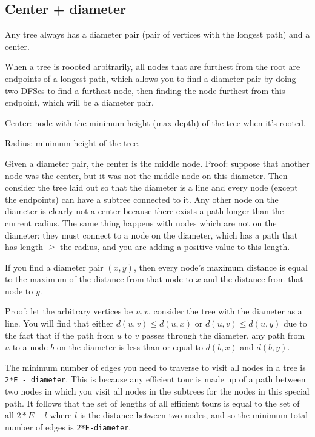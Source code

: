 \documentclass[12pt]{article}
\newcommand{\code}[1]{\texttt{#1}}
\begin{document}
\subsection{Center + diameter}
Any tree always has a diameter pair (pair of vertices with
the longest path) and a center.

When a tree is roooted arbitrarily, all nodes
that are furthest from the root are
endpoints of a longest path, which allows you to
find a diameter pair by doing two DFSes to find a furthest node,
then finding the node furthest from this endpoint, which will be a
diameter pair.

Center: node with the minimum height (max depth) of the tree when
it's rooted.

Radius: minimum height of the tree.

Given a diameter pair, the center is the middle node.
Proof: suppose that another node was the center, but it was not the middle node
on this diameter. Then consider the
tree laid out so that
the diameter is a line and
every node (except the endpoints)
can have a subtree connected to it.
Any other node on the diameter is clearly
not a center because there exists a path longer than the current radius.
The same thing happens with nodes which are not on the diameter:
they must connect to a node on the diameter, which has a path
that has length $\geq$ the radius, and you are adding a positive
value to this length.

If you find a diameter pair $(x, y)$, then every node's maximum distance
is equal to the maximum of the distance from that node to $x$ and
the distance from that node to $y$.

Proof: let the arbitrary vertices be $u, v$. consider the tree with the diameter
as a line. You will find that either
$d(u, v) \leq d(u, x)$ or $d(u, v) \leq d(u, y)$ due to the fact that
if the path from $u$ to $v$ passes through the diameter,
any path from $u$ to a node $b$
on the diameter is less than or equal to $d(b, x)$ and $d(b, y)$.


The minimum number of edges you need to traverse to visit all nodes
in a tree is \code{2*E - diameter}.
This is because any efficient tour is made up of a path
between two nodes in which you visit all nodes in the subtrees for
the nodes in this special path. It follows that the set of lengths
of all efficient tours is equal to the set of all $2*E-l$ where
$l$ is the distance between two nodes,
and so the minimum total number of edges is \code{2*E-diameter}.
\end{document}
